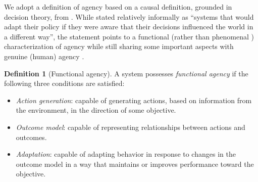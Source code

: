 \documentclass{article}
\theoremstyle{plain}
\theoremstyle{definition}
\newtheorem{definition}[theorem]{Definition}
\theoremstyle{remark}
\begin{document}
We adopt a definition of agency based on a causal definition, grounded in decision theory, from \cite{kenton2023discovering}. While stated relatively informally as ``systems that would adapt their policy if they were aware that their decisions influenced the world in a different way'', the statement 
points to a functional (rather than phenomenal \cite{chalmers1997conscious}) characterization of agency while still sharing some important aspects with genuine (human) agency \cite{rosenblueth1943behavior,emirbayer1998agency}.


\begin{definition}[Functional agency]\label{def:agency}
A system possesses \emph{functional agency} if the following three conditions are satisfied: 
\begin{itemize}
\item[i)] \emph{Action generation}: capable of generating actions, based on information from the environment, in the direction of some objective. 
\item[ii)]  \emph{Outcome model}: capable of representing relationships between actions and outcomes.
\item[iii)] \emph{Adaptation}: capable of adapting behavior in response to changes in the outcome model in a way that maintains or improves performance toward the objective.
\end{itemize}
\end{definition}
\end{document}
